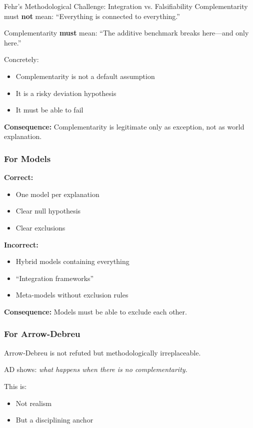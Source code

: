 \begin{chapter}{Fehr's Methodological Challenge: Integration vs. Falsifiability}
Complementarity must \textbf{not} mean: ``Everything is connected to everything.''

Complementarity \textbf{must} mean: ``The additive benchmark breaks here---and only here.''

Concretely:
\begin{itemize}[noitemsep]
    \item Complementarity is not a default assumption
    \item It is a risky deviation hypothesis
    \item It must be able to fail
\end{itemize}

\textbf{Consequence:} Complementarity is legitimate only as exception, not as world explanation.

\subsubsection{For Models}

\textbf{Correct:}
\begin{itemize}[noitemsep]
    \item One model per explanation
    \item Clear null hypothesis
    \item Clear exclusions
\end{itemize}

\textbf{Incorrect:}
\begin{itemize}[noitemsep]
    \item Hybrid models containing everything
    \item ``Integration frameworks''
    \item Meta-models without exclusion rules
\end{itemize}

\textbf{Consequence:} Models must be able to exclude each other.

\subsubsection{For Arrow-Debreu}

Arrow-Debreu is not refuted but methodologically irreplaceable.

AD shows: \textit{what happens when there is no complementarity.}

This is:
\begin{itemize}[noitemsep]
    \item Not realism
    \item But a disciplining anchor
\end{itemize}


\end{chapter}

